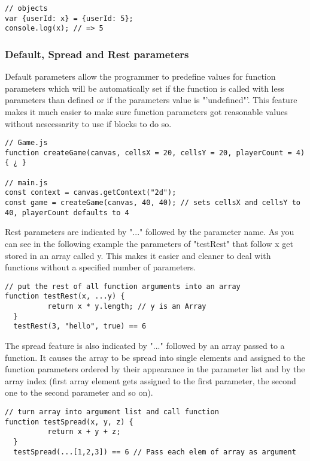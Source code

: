 \documentclass{bioinfo}
\begin{document}
\begin{lstlisting}[caption= My Javascript Example]
// objects
var {userId: x} = {userId: 5};
console.log(x); // => 5
\end{lstlisting}

\subsubsection{Default, Spread and Rest parameters}
Default parameters allow the programmer to predefine values for function parameters which will be automatically
set if the function is called with less parameters than defined or if the parameters value is "'undefined"'.
This feature makes it much easier to make sure function parameters got reasonable values without nescessarity to
use if blocks to do so.

\begin{lstlisting}[caption= My Javascript Example]
// Game.js
function createGame(canvas, cellsX = 20, cellsY = 20, playerCount = 4) { ¿ }

// main.js
const context = canvas.getContext("2d");
const game = createGame(canvas, 40, 40); // sets cellsX and cellsY to 40, playerCount defaults to 4
\end{lstlisting}

Rest parameters are indicated by  "..." followed by the parameter name. As you can see in the following 
example the parameters of "testRest" that follow x get stored in an array called y. This makes it easier
and cleaner to deal with functions without a specified number of parameters.

\begin{lstlisting}[caption= My Javascript Example]
// put the rest of all function arguments into an array
function testRest(x, ...y) {
          return x * y.length; // y is an Array
  }
  testRest(3, "hello", true) == 6
\end{lstlisting}

The spread feature is also indicated by "..." followed by an array passed to a function. It causes the array to be spread into single
elements and assigned to the function parameters ordered by their appearance in the parameter list and by the array index (first array element gets assigned to the first parameter, the second one to the second parameter and so on).
\begin{lstlisting}[caption= My Javascript Example]
// turn array into argument list and call function
function testSpread(x, y, z) {
          return x + y + z;
  }
  testSpread(...[1,2,3]) == 6 // Pass each elem of array as argument
\end{lstlisting}
\end{document}
